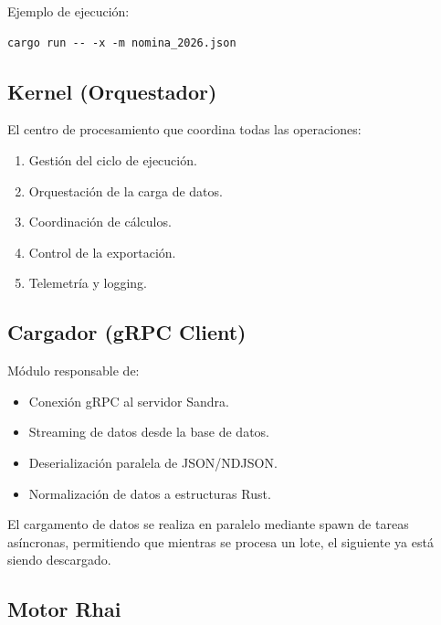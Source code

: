 \bigskip

Ejemplo de ejecución:

\begin{lstlisting}
cargo run -- -x -m nomina_2026.json
\end{lstlisting}

\bigskip

\subsection{Kernel (Orquestador)}

El centro de procesamiento que coordina todas las operaciones:

\begin{enumerate}
    \item Gestión del ciclo de ejecución.
    \item Orquestación de la carga de datos.
    \item Coordinación de cálculos.
    \item Control de la exportación.
    \item Telemetría y logging.
\end{enumerate}

\bigskip

\subsection{Cargador (gRPC Client)}

Módulo responsable de:

\begin{itemize}
    \item Conexión gRPC al servidor Sandra.
    \item Streaming de datos desde la base de datos.
    \item Deserialización paralela de JSON/NDJSON.
    \item Normalización de datos a estructuras Rust.
\end{itemize}

\bigskip

El cargamento de datos se realiza en paralelo mediante spawn de tareas asíncronas, permitiendo que mientras se procesa un lote, el siguiente ya está siendo descargado.

\bigskip

\subsection{Motor Rhai}


